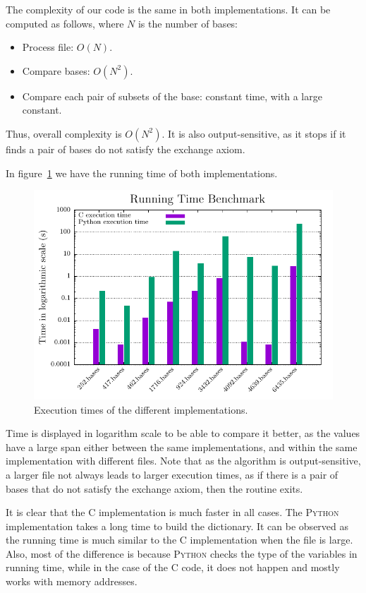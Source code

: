 \documentclass[11pt]{amsart}
\begin{document}
The complexity of our code is the same in both implementations.
It can be computed as follows, where $N$ is the number of bases:

\begin{itemize}
 \item Process file: $O(N)$.
 \item Compare bases: $O(N^2)$.
 \item Compare each pair of subsets of the base:
       constant time, with a large constant.
\end{itemize}

Thus, overall complexity is $O(N^2)$.
It is also output-sensitive,
as it stops if it finds a pair of bases do not satisfy the exchange axiom.

In figure~\ref{fig:Tresplans} we have the running time of both implementations.

\begin{figure}[h!]
    \centering
    \includegraphics[width=.75\textwidth]{./Tresplans/Tresplans_exec_time.pdf}
    \caption{Execution times of the different implementations.
    \label{fig:Tresplans}}
\end{figure}

Time is displayed in logarithm scale to be able to compare it better,
as the values have a large span either between the same implementations,
and within the same implementation with different files.
Note that as the algorithm is output-sensitive,
a larger file not always leads to larger execution times,
as if there is a pair of bases that do not satisfy the exchange axiom,
then the routine exits.

It is clear that the \textsc{C} implementation is much faster in all cases.
The \textsc{Python} implementation takes a long time to build the dictionary.
It can be observed as the running time is much similar to the
\textsc{C} implementation when the file is large.
Also, most of the difference is because \textsc{Python} checks the type
of the variables in running time,
while in the case of the \textsc{C} code,
it does not happen and mostly works with memory addresses.
\end{document}
